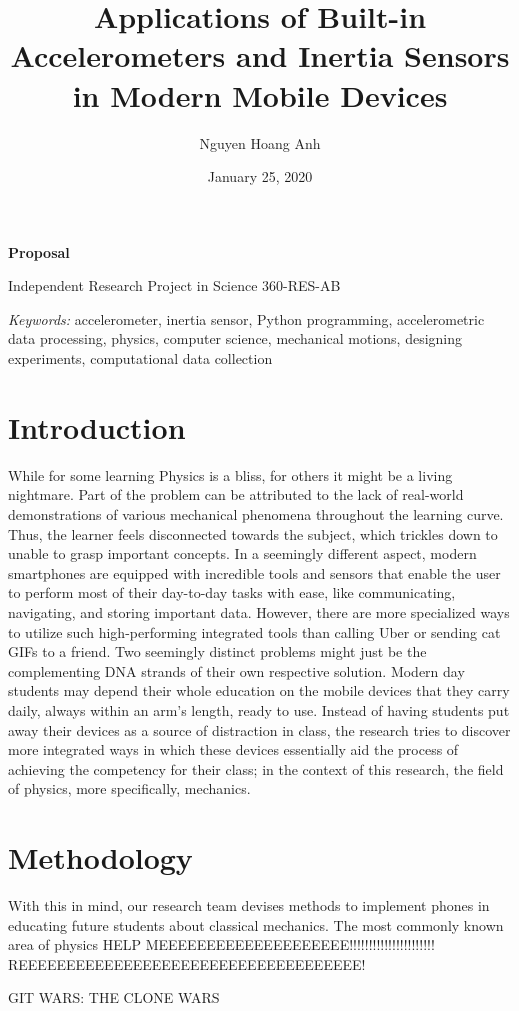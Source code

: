 \documentclass[11pt, a4paper]{article}
\author{Nguyen Hoang Anh}
\affil{John Abbott College, Sainte-Anne-de-Bellevue, Quebec\\ \email{hoanganh.theodore@icloud.com}}
\date{January 25, 2020}
\title{Applications of Built-in Accelerometers and Inertia Sensors in Modern Mobile Devices}
\begin{document}
    \maketitle

    \begin{center}
        \textbf{Proposal}

        Independent Research Project in Science 360-RES-AB       
    \end{center}
    \textit{Keywords:} accelerometer, inertia sensor, Python programming, accelerometric data processing, physics, computer science, mechanical motions, designing experiments, computational data collection

    \section{Introduction}
    While for some learning Physics is a bliss, for others it might be a living nightmare. Part of the problem can be attributed to the lack of real-world demonstrations of various mechanical phenomena throughout the learning curve. Thus, the learner feels disconnected towards the subject, which trickles down to unable to grasp important concepts. In a seemingly different aspect, modern smartphones are equipped with incredible tools and sensors that enable the user to perform most of their day-to-day tasks with ease, like communicating, navigating, and storing important data. However, there are more specialized ways to utilize such high-performing integrated tools than calling Uber or sending cat GIFs to a friend. Two seemingly distinct problems might just be the complementing DNA strands of their own respective solution. Modern day students may depend their whole education on the mobile devices that they carry daily, always within an arm's length, ready to use. Instead of having students put away their devices as a source of distraction in class, the research tries to discover more integrated ways in which these devices essentially aid the process of achieving the competency for their class; in the context of this research, the field of physics, more specifically, mechanics.
    \section{Methodology}
    With this in mind, our research team devises methods to implement phones in educating future students about classical mechanics. The most commonly known area of physics 
    HELP MEEEEEEEEEEEEEEEEEEEE!!!!!!!!!!!!!!!!!!!!!! REEEEEEEEEEEEEEEEEEEEEEEEEEEEEEEEEEEE!
    
    GIT WARS: THE CLONE WARS
\end{document}
